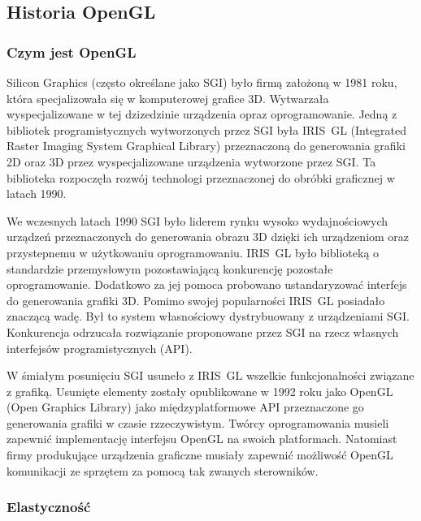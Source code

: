 \subsection{Historia OpenGL}
\thispagestyle{empty}
\par\indent

\subsubsection{Czym jest OpenGL}
\thispagestyle{empty}
\par\indent

Silicon Graphics (często określane jako SGI) było firmą założoną w 1981 roku, która specjalizowała się w komputerowej grafice 3D. Wytwarzała wyspecjalizowane w tej dzizedzinie urządzenia opraz oprogramowanie. Jedną z bibliotek programistycznych wytworzonych przez SGI była IRIS~GL (Integrated Raster Imaging System Graphical Library) przeznaczoną do generowania grafiki 2D oraz 3D przez wyspecjalizowane urządzenia wytworzone przez SGI. Ta biblioteka rozpoczęła rozwój technologi przeznaczonej do obróbki graficznej w latach 1990.

We wczesnych latach 1990 SGI było liderem rynku wysoko wydajnościowych urządzeń przeznaczonych do generowania obrazu 3D dzięki ich urządzeniom oraz przystepnemu w użytkowaniu oprogramowaniu. IRIS~GL było biblioteką o standardzie przemysłowym pozostawiającą konkurencję pozostałe oprogramowanie. Dodatkowo za jej pomoca probowano ustandaryzować interfejs do generowania grafiki 3D. Pomimo swojej popularności IRIS~GL posiadało znaczącą wadę. Był to system własnościowy dystrybuowany z urządzeniami SGI. Konkurencja odrzucała rozwiązanie proponowane przez SGI na rzecz własnych interfejsów programistycznych (API).

W śmiałym posunięciu SGI usuneło z IRIS~GL wszelkie funkcjonalności związane z grafiką. Usunięte elementy zostały opublikowane w 1992 roku jako OpenGL (Open Graphics Library) jako międzyplatformowe API przeznaczone go generowania grafiki w czasie rzzeczywistym. Twórcy oprogramowania musieli zapewnić implementację interfejsu OpenGL na swoich platformach. Natomiast firmy produkujące urządzenia graficzne musiały zapewnić  możliwość OpenGL komunikacji ze sprzętem za pomocą tak zwanych sterowników.

\subsubsection{Elastyczność}
\thispagestyle{empty}
\par\indent

